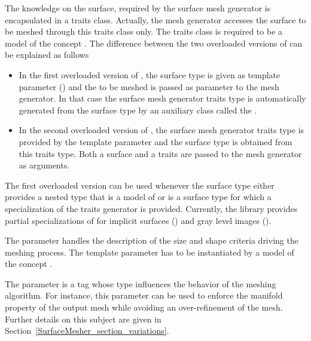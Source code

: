 The knowledge on the surface, required by the surface mesh generator
is  encapsulated in a
traits class. Actually, the mesh generator accesses the surface to be meshed
through this traits class only.
The traits class is required to be a model
of the concept .
The difference between the two overloaded versions of
can be explained as follows
\begin{itemize}
\item
In the first  overloaded version
of ,  the surface type  is given
as template parameter  () and the 
to be meshed is passed as parameter to the mesh generator.
In that case the surface mesh generator traits type
is  automatically generated from the surface type
by an auxiliary class called  the .
\item In the second overloaded version of ,
the surface mesh generator traits type is provided
by the  template parameter 
and the surface type is obtained from this traits type.
Both  a surface and a traits
are passed to the mesh generator as arguments.
\end{itemize}


The first overloaded version can be used
whenever the surface type either provides  a nested type
that is  a model of 
or is a surface type for which a specialization
of the traits generator 
is provided.
Currently, the library provides partial specializations
of  
for implicit surfaces () and
gray level images ().



The parameter  handles the description of the size and shape
criteria driving the meshing process. The template parameter 
has to be instantiated by a model of the concept .


The parameter   is a tag
whose type influences the behavior of the
meshing algorithm. For instance, this parameter
can be used to enforce the manifold property
of the output mesh while avoiding
an over-refinement of the mesh. Further details on this
subject are given in
Section~\ref{SurfaceMesher_section_variations}.

